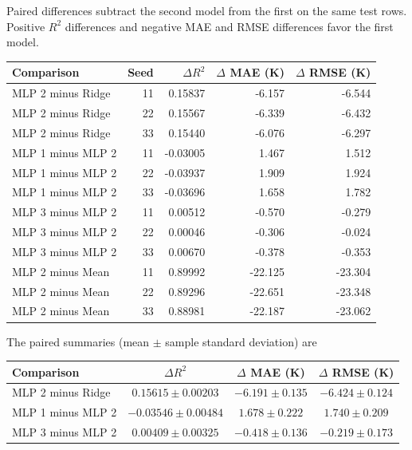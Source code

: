 \documentclass[12pt]{article}
\begin{document}
\begin{enumerate}
\begin{enumerate}[label=\textbf{\Alph*.}, leftmargin=*]
       Paired differences subtract the second model from the first on
       the same test rows. Positive $R^2$ differences and negative MAE
       and RMSE differences favor the first model.
       \begin{center}
       {\small
       \begin{tabular}{l r r r r}
           \toprule
           Comparison & Seed & $\Delta R^2$ & $\Delta$ MAE (K) & $\Delta$ RMSE (K) \\
           \midrule
           MLP 2 minus Ridge & 11 & 0.15837 & -6.157 & -6.544 \\
           MLP 2 minus Ridge & 22 & 0.15567 & -6.339 & -6.432 \\
           MLP 2 minus Ridge & 33 & 0.15440 & -6.076 & -6.297 \\
           MLP 1 minus MLP 2 & 11 & -0.03005 & 1.467 & 1.512 \\
           MLP 1 minus MLP 2 & 22 & -0.03937 & 1.909 & 1.924 \\
           MLP 1 minus MLP 2 & 33 & -0.03696 & 1.658 & 1.782 \\
           MLP 3 minus MLP 2 & 11 & 0.00512 & -0.570 & -0.279 \\
           MLP 3 minus MLP 2 & 22 & 0.00046 & -0.306 & -0.024 \\
           MLP 3 minus MLP 2 & 33 & 0.00670 & -0.378 & -0.353 \\
           MLP 2 minus Mean & 11 & 0.89992 & -22.125 & -23.304 \\
           MLP 2 minus Mean & 22 & 0.89296 & -22.651 & -23.348 \\
           MLP 2 minus Mean & 33 & 0.88981 & -22.187 & -23.062 \\
           \bottomrule
       \end{tabular}}
       \end{center}
       The paired summaries (mean $\pm$ sample standard deviation) are
       \begin{center}
       {\small
       \begin{tabular}{l c c c}
           \toprule
           Comparison & $\Delta R^2$ & $\Delta$ MAE (K) & $\Delta$ RMSE (K) \\
           \midrule
           MLP 2 minus Ridge & $0.15615\pm0.00203$ & $-6.191\pm0.135$ & $-6.424\pm0.124$ \\
           MLP 1 minus MLP 2 & $-0.03546\pm0.00484$ & $1.678\pm0.222$ & $1.740\pm0.209$ \\
           MLP 3 minus MLP 2 & $0.00409\pm0.00325$ & $-0.418\pm0.136$ & $-0.219\pm0.173$ \\

\end{tabular}}
\end{center}
\end{enumerate}
\end{enumerate}
\end{document}
